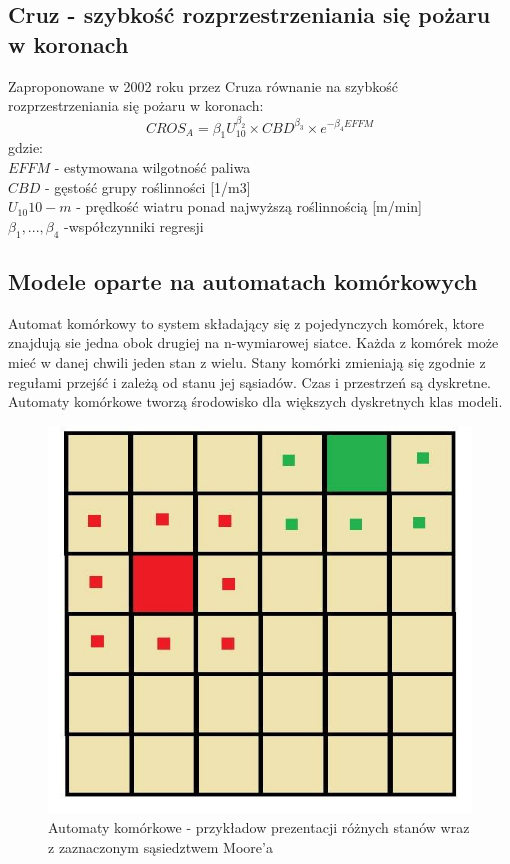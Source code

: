 \documentclass[a4paper, 11pt]{article}
\begin{document}
	\subsection{Cruz - szybkość rozprzestrzeniania się pożaru w koronach}
	\indent
	Zaproponowane w 2002 roku przez Cruza równanie na szybkość rozprzestrzeniania się pożaru w koronach: 
	$$
	CROS_A=\beta_1U^{\beta_2}_10 \times CBD^{\beta_3} \times e^{-\beta_4EFFM}
	$$
	gdzie: \\
	$EFFM$ - estymowana wilgotność paliwa \\
	$CBD$ - gęstość grupy roślinności [1/m3]\\
	$U_10  10-m$ - prędkość wiatru ponad najwyższą roślinnością [m/min]\\
	$\beta_1, ...,\beta_4$ -współczynniki regresji\\
	\subsection{Modele oparte na automatach komórkowych}	
	\indent
	
	Automat komórkowy to system składający się z pojedynczych komórek, ktore znajdują sie jedna obok drugiej na n-wymiarowej siatce. Każda z komórek może mieć w danej chwili jeden stan z wielu. Stany komórki zmieniają się zgodnie z regułami przejść i zależą od stanu jej sąsiadów. Czas i przestrzeń są dyskretne.\\
	
	Automaty komórkowe tworzą środowisko dla większych dyskretnych klas modeli.
	\begin{figure}[H]
		\centerline{\includegraphics[scale=0.4]{automaty}}
		\raggedright{	\caption{Automaty komórkowe - przykładow prezentacji różnych stanów wraz z zaznaczonym sąsiedztwem Moore'a}}
	\end{figure}
		
\end{document}
